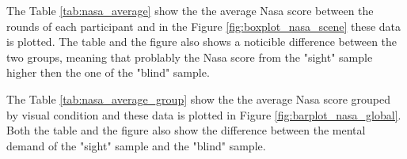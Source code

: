 The Table \ref{tab:nasa_average} show the the average Nasa score between the rounds of each participant and in the Figure \ref{fig:boxplot_nasa_scene} these data is plotted. The table and the figure also shows a noticible difference between the two groups, meaning that problably the Nasa score from the "sight" sample higher then the one of the "blind" sample.



The Table \ref{tab:nasa_average_group} show the the average Nasa score grouped by visual condition and these data is plotted in Figure \ref{fig:barplot_nasa_global}. Both the table and the figure also show the difference between the mental demand of the "sight" sample and the "blind" sample.




